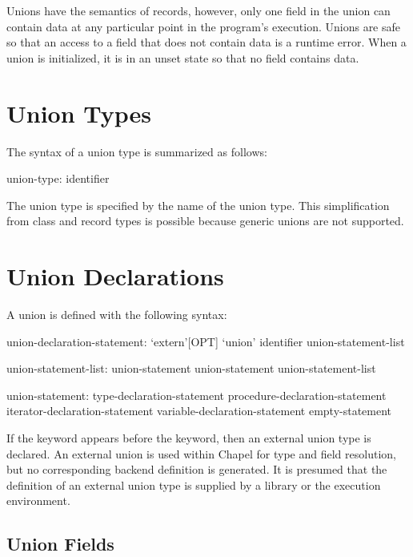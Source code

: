 \label{Unions}

Unions have the semantics of records, however, only one field in the
union can contain data at any particular point in the program's
execution.  Unions are safe so that an access to a field that does not
contain data is a runtime error.  When a union is initialized, it is
in an unset state so that no field contains data.

\section{Union Types}
\label{Union_Types}

The syntax of a union type is summarized as follows:
\begin{syntax}
union-type:
  identifier
\end{syntax}
The union type is specified by the name of the union type.  This
simplification from class and record types is possible because generic
unions are not supported.

\section{Union Declarations}
\label{Union_Declarations}

A union is defined with the following syntax:
\begin{syntax}
union-declaration-statement:
  `extern'[OPT] `union' identifier { union-statement-list }

union-statement-list:
  union-statement
  union-statement union-statement-list

union-statement:
  type-declaration-statement
  procedure-declaration-statement
  iterator-declaration-statement
  variable-declaration-statement
  empty-statement
\end{syntax}

If the  keyword appears before the  keyword, then an
external union type is declared.  An external union is used within Chapel
for type and field resolution, but no corresponding backend definition is
generated.  It is presumed that the definition of an external union type is supplied
by a library or the execution environment.

\subsection{Union Fields}
\label{Union_Fields}

